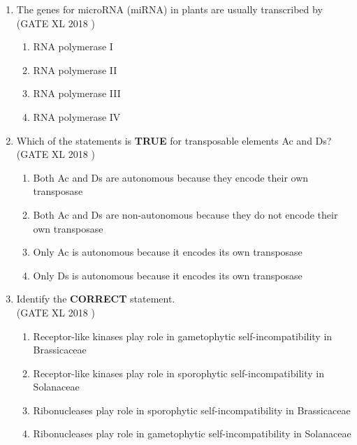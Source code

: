 \documentclass[14pt]{extarticle}
\begin{document}
\begin{flushleft}
\begin{enumerate}[leftmargin=*]
    \item The genes for microRNA (miRNA) in plants are usually transcribed by\\
    \hfill(GATE XL 2018 )
    \begin{multicols}{2}
    \begin{enumerate}[label=(\Alph*)]
        \item RNA polymerase I
        \item RNA polymerase II
        \item RNA polymerase III
        \item RNA polymerase IV
    \end{enumerate}
    \end{multicols}

    \item Which of the statements is \textbf{TRUE} for transposable elements Ac and Ds?\\
  \hfill(GATE XL 2018 ) 
    \begin{enumerate}[label=(\Alph*)]
        \item Both Ac and Ds are autonomous because they encode their own transposase
        \item Both Ac and Ds are non-autonomous because they do not encode their own transposase
        \item Only Ac is autonomous because it encodes its own transposase
        \item Only Ds is autonomous because it encodes its own transposase
    \end{enumerate}
    

    \item Identify the \textbf{CORRECT} statement.\\
   \hfill(GATE XL 2018 )
    \begin{enumerate}[label=(\Alph*)]
        \item Receptor-like kinases play role in gametophytic self-incompatibility in Brassicaceae
        \item Receptor-like kinases play role in sporophytic self-incompatibility in Solanaceae
        \item Ribonucleases play role in sporophytic self-incompatibility in Brassicaceae
        \item Ribonucleases play role in gametophytic self-incompatibility in Solanaceae
    \end{enumerate}
    


\end{enumerate}
\end{flushleft}
\end{document}
